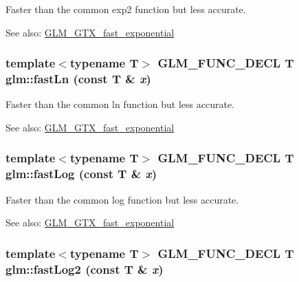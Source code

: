 Faster than the common exp2 function but less accurate. \begin{Desc}
\item[See also:]\hyperlink{group__gtx__fast__exponential}{GLM\_\-GTX\_\-fast\_\-exponential} \end{Desc}
\hypertarget{group__gtx__fast__exponential_g5ffa4e8267716faa2e164a6e0a7335fe}{
\subsubsection[fastLn]{\setlength{\rightskip}{0pt plus 5cm}template$<$typename T$>$ GLM\_\-FUNC\_\-DECL T glm::fastLn (const T \& {\em x})}}
\label{group__gtx__fast__exponential_g5ffa4e8267716faa2e164a6e0a7335fe}


Faster than the common ln function but less accurate. \begin{Desc}
\item[See also:]\hyperlink{group__gtx__fast__exponential}{GLM\_\-GTX\_\-fast\_\-exponential} \end{Desc}
\hypertarget{group__gtx__fast__exponential_g8f05b41fb9e7991a5a73f6d4a281d3f3}{
\subsubsection[fastLog]{\setlength{\rightskip}{0pt plus 5cm}template$<$typename T$>$ GLM\_\-FUNC\_\-DECL T glm::fastLog (const T \& {\em x})}}
\label{group__gtx__fast__exponential_g8f05b41fb9e7991a5a73f6d4a281d3f3}


Faster than the common log function but less accurate. \begin{Desc}
\item[See also:]\hyperlink{group__gtx__fast__exponential}{GLM\_\-GTX\_\-fast\_\-exponential} \end{Desc}
\hypertarget{group__gtx__fast__exponential_gb7e579d5f2bf90e6b68baf3071a5c4a8}{
\subsubsection[fastLog2]{\setlength{\rightskip}{0pt plus 5cm}template$<$typename T$>$ GLM\_\-FUNC\_\-DECL T glm::fastLog2 (const T \& {\em x})}}
\label{group__gtx__fast__exponential_gb7e579d5f2bf90e6b68baf3071a5c4a8}


